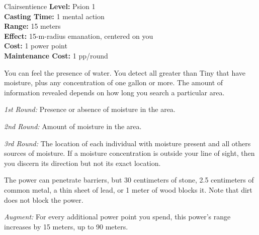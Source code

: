 {Clairsentience}
{
	\textbf{Level:}
	Psion 1\\
	\textbf{Casting Time:}
	1 mental action\\
	\textbf{Range:}
	15 meters\\
	\textbf{Effect:}
	15-m-radius emanation, centered on you\\
	\textbf{Cost:}
	1 power point\\
	\textbf{Maintenance Cost:}
	1 pp/round\\
}
{
	You can feel the presence of water. You detect all greater than Tiny that have moisture, plus any concentration of one gallon or more. The amount of information revealed depends on how long you search a particular area.

	\textit{1st Round:} Presence or absence of moisture in the area.

	\textit{2nd Round:} Amount of moisture in the area.

	\textit{3rd Round:} The location of each individual with moisture present and all others sources of moisture. If a moisture concentration is outside your line of sight, then you discern its direction but not its exact location.

	The power can penetrate barriers, but 30 centimeters of stone, 2.5 centimeters of common metal, a thin sheet of lead, or 1 meter of wood blocks it. Note that dirt does not block the power.

	\textit{Augment:} For every additional power point you spend, this power's range increases by 15 meters, up to 90 meters.
}